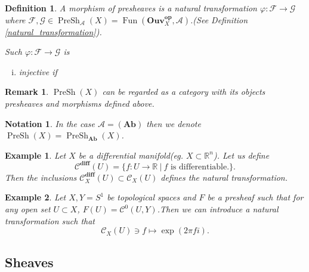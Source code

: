 \documentclass{article}
\newtheorem{definition}{Definition}[section]
\newtheorem{notation}{Notation}[section]
\newtheorem{remark}{Remark}[section]
\newtheorem{example}{Example}[section]
\numberwithin{equation}{section}
\DeclareMathOperator{\PreSh}{PreSh}
\DeclareMathOperator{\Fun}{Fun}
\begin{document}
\begin{definition}
A morphism of presheaves is a natural transformation $\varphi:\mathcal{F}\to \mathcal{G}$ where $\mathcal{F},\mathcal{G}\in\PreSh_\mathcal{A}(X)=\Fun(\mathbf{Ouv}_X^{\mathbf{op}},\mathcal{A})$.(See Definition \ref{natural_transformation}).\\
\par Such $\varphi:\mathcal{F}\to\mathcal{G}$ is 
\begin{enumerate}[i).]
\item injective if 
\end{enumerate}
\end{definition}



\begin{remark}
$\PreSh(X)$ can be regarded as a category with its objects presheaves and morphisms defined above. 
\end{remark}

\begin{notation}
In the case $\mathcal{A}= (\mathbf{Ab})$ then we denote $\PreSh(X)=\PreSh_{\mathbf{Ab}}(X)$.
\end{notation}

\begin{example}
Let $X$ be a differential manifold(eg. $X\subset\mathbb{R}^n$). Let us define 
\begin{equation*}
\mathcal{C}^{\mathbf{diff}}(U) = \{f:U\to\mathbb{R}\:|\:f\text{ is differentiable.}\}. 
\end{equation*}
Then the inclusions $\mathcal{C}_X^{\mathbf{diff}}(U)\subset\mathcal{C}_X(U)$ defines the natural transformation.
\end{example}

\begin{example}
Let $X,Y=S^1$ be topological spaces and $F$ be a presheaf such that for any open set $U\subset X$, $F(U)=\mathcal{C}^0(U,Y)$.Then we can introduce a natural transformation such that 
\begin{equation*}
\mathcal{C}_X(U)\ni f\mapsto \exp(2\pi fi).
\end{equation*}
\end{example}

\subsection{Sheaves}
\end{document}
